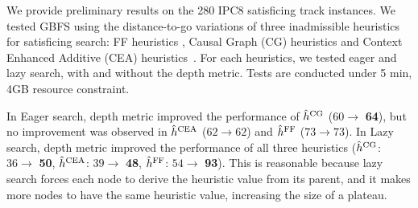We provide preliminary results on the 280 IPC8 satisficing track
instances. We tested GBFS using the distance-to-go variations of three
\sota inadmissible heuristics for satisficing search: FF heuristics
 \cite{Hoffmann01}, Causal Graph (CG) heuristics \cite{Helmert2006} and
Context Enhanced Additive (CEA) heuristics\ \cite{helmert2008unifying}.
For each heuristics, we tested eager and lazy search, with and without
the depth metric.  Tests are conducted under 5 min, 4GB
resource constraint.

In Eager search, depth metric
improved the performance of $\hat{h}^{\text{CG}}$ ($60\rightarrow $ \textbf{64}), but no
improvement was observed in $\hat{h}^{\text{CEA}}$ ($62\rightarrow 62$)
and $\hat{h}^{\text{FF}}$ ($73\rightarrow 73$). In Lazy search, depth metric
improved the performance of all three heuristics
($\hat{h}^{\text{CG}}$: $36\rightarrow $ \textbf{50}, 
 $\hat{h}^{\text{CEA}}$: $39\rightarrow $ \textbf{48}, 
 $\hat{h}^{\text{FF}}$: $54\rightarrow $ \textbf{93}). This is reasonable
because lazy search forces each node to derive the heuristic value from
its parent, and it makes more nodes to have the same heuristic value,
increasing the size of a plateau.

%  

